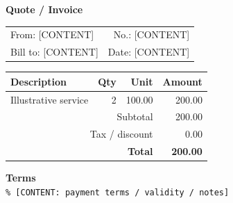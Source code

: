 \documentclass[10.5pt,a4paper]{scrartcl}
\begin{document}
{\Huge\bfseries Quote / Invoice\par}
\begin{tabularx}{\linewidth}{@{}Xr@{}}From: [CONTENT]&No.: [CONTENT]\\Bill to: [CONTENT]&Date: [CONTENT]\end{tabularx}
\vspace{1.5em}
\begin{tabularx}{\linewidth}{@{}X r r r@{}}\toprule Description&Qty&Unit&Amount\\\midrule Illustrative service&2&100.00&200.00\\\midrule\multicolumn{3}{r}{Subtotal}&200.00\\\multicolumn{3}{r}{Tax / discount}&0.00\\\multicolumn{3}{r}{\bfseries Total}&\bfseries 200.00\\\bottomrule\end{tabularx}
\vspace{1em}\textbf{Terms}\\\texttt{\% [CONTENT: payment terms / validity / notes]}
\end{document}

